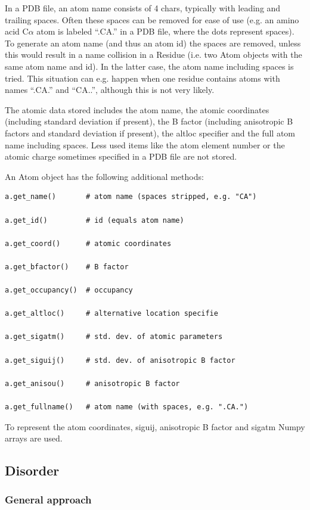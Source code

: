 \documentclass{report}
\begin{document}
In a PDB file, an atom name consists of 4 chars, typically with leading and
trailing spaces. Often these spaces can be removed for ease of use (e.g. an
amino acid C\( \alpha  \) atom is labeled {}``.CA.{}'' in a PDB file, where
the dots represent spaces). To generate an atom name (and thus an atom id) the
spaces are removed, unless this would result in a name collision in a Residue
(i.e. two Atom objects with the same atom name and id). In the latter case,
the atom name including spaces is tried. This situation can e.g. happen when
one residue contains atoms with names {}``.CA.{}'' and {}``CA..{}'', although
this is not very likely. 

The atomic data stored includes the atom name, the atomic coordinates (including
standard deviation if present), the B factor (including anisotropic B factors
and standard deviation if present), the altloc specifier and the full atom name
including spaces. Less used items like the atom element number or the atomic
charge sometimes specified in a PDB file are not stored. 

An Atom object has the following additional methods: 

\begin{verbatim}
a.get_name()       # atom name (spaces stripped, e.g. "CA")

a.get_id()         # id (equals atom name)

a.get_coord()      # atomic coordinates

a.get_bfactor()    # B factor

a.get_occupancy()  # occupancy

a.get_altloc()     # alternative location specifie

a.get_sigatm()     # std. dev. of atomic parameters

a.get_siguij()     # std. dev. of anisotropic B factor

a.get_anisou()     # anisotropic B factor

a.get_fullname()   # atom name (with spaces, e.g. ".CA.")
\end{verbatim}

To represent the atom coordinates, siguij, anisotropic B factor and sigatm Numpy
arrays are used.


\subsection{Disorder}


\subsubsection{General approach\label{disorder problems}}
\end{document}
